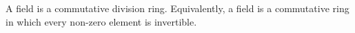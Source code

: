 A field is a commutative division ring. Equivalently, a field is a commutative ring in which every non-zero element is invertible.
